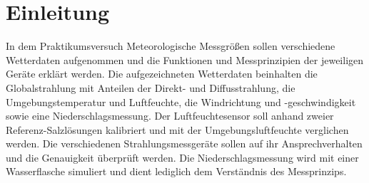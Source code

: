 \section{Einleitung}

In dem Praktikumsversuch Meteorologische Messgrößen sollen verschiedene Wetterdaten aufgenommen und die Funktionen und Messprinzipien der jeweiligen Geräte erklärt werden.
Die aufgezeichneten Wetterdaten beinhalten die Globalstrahlung mit Anteilen der Direkt- und Diffusstrahlung, die Umgebungstemperatur und Luftfeuchte, die Windrichtung und -geschwindigkeit sowie eine Niederschlagsmessung. Der Luftfeuchtesensor soll anhand zweier Referenz-Salzlösungen kalibriert und mit der Umgebungsluftfeuchte verglichen werden. Die verschiedenen Strahlungsmessgeräte sollen auf ihr Ansprechverhalten und die Genauigkeit überprüft werden. Die Niederschlagsmessung wird mit einer Wasserflasche simuliert und dient lediglich dem Verständnis des Messprinzips.

